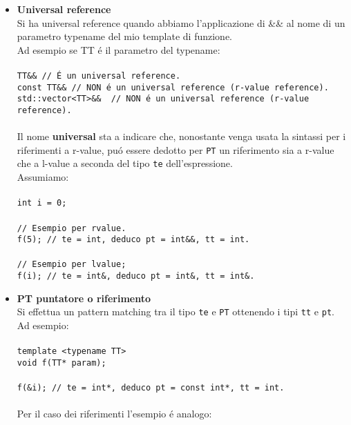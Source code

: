 \documentclass{article}
\begin{document}
\begin{itemize}
\item \textbf{\textcolor{blu}{Universal reference}}\\Si ha universal reference quando abbiamo l'applicazione di \&\& al nome di un parametro typename del mio template di funzione.\\Ad esempio se TT \'e il parametro del typename:\\ \\
\texttt{TT\&\& \textcolor{grigio}{// \'E un universal reference.}}\\
\texttt{const TT\&\& \textcolor{grigio}{// NON \'e un universal reference (r-value reference).}}\\
\texttt{std::vector<TT>\&\& \textcolor{grigio}{ // NON \'e un universal reference (r-value reference).}}\\ \\
Il nome \textbf{universal} sta a indicare che, nonostante venga usata la sintassi per i riferimenti a r-value, pu\'o essere dedotto per \texttt{PT} un riferimento sia a r-value che a l-value a seconda del tipo \texttt{te} dell'espressione. \\ Assumiamo:\\ \\
\texttt{int i = 0;\\ \\\textcolor{grigio}{// Esempio per rvalue.}\\f(5); \textcolor{grigio}{// te = int, deduco pt = int\&\&, tt = int. }\\ \\ \textcolor{grigio}{// Esempio per lvalue; }\\f(i); \textcolor{grigio}{// te = int\&, deduco pt = int\&, tt = int\&.}} \\
\item \textbf{\textcolor{blu}{PT puntatore o riferimento}} \\ Si effettua un pattern matching tra il tipo \texttt{te} e \texttt{PT} ottenendo i tipi \texttt{tt} e \texttt{pt}.\\Ad esempio:\\ \\
\texttt{template <typename TT> \\ void f(TT* param); \\ \\ f(\&i); \textcolor{grigio}{// te = int*, deduco pt = const int*, tt = int.}} \\ \\
Per il caso dei riferimenti l'esempio \'e analogo: \\ \\

\end{itemize}
\end{document}
